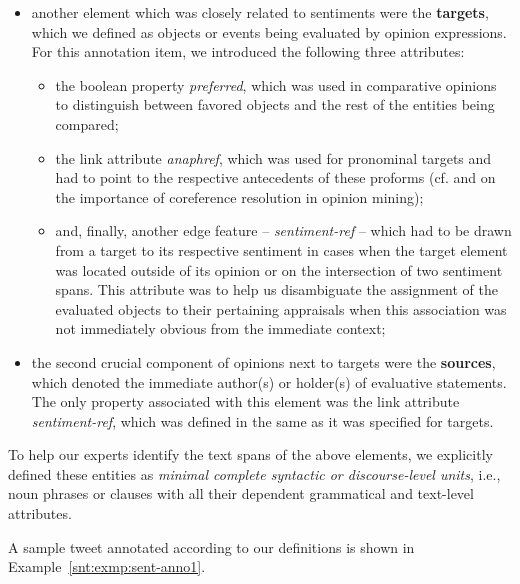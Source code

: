 \begin{itemize}
\item
  another element which was closely related to sentiments were the
  \textbf{targets}, which we defined as objects or events being
  evaluated by opinion expressions.  For this annotation item, we
  introduced the following three attributes:
  \begin{itemize}
    \item
      the boolean property \emph{preferred}, which was used in
      comparative opinions to distinguish between favored objects and
      the rest of the entities being compared;
    \item
      the link attribute \emph{anaphref}, which was used for
      pronominal targets and had to point to the respective
      antecedents of these proforms (cf. \citet{Stoyanov:06} and
      \citet{Ding:10} on the importance of coreference resolution in
      opinion mining);
    \item
      and, finally, another edge feature -- \emph{sentiment-ref} --
      which had to be drawn from a target to its respective sentiment
      in cases when the target element was located outside of its
      opinion or on the intersection of two sentiment spans.  This
      attribute was to help us disambiguate the assignment of the
      evaluated objects to their pertaining appraisals when this
      association was not immediately obvious from the immediate
      context;
  \end{itemize}

\item
  the second crucial component of opinions next to targets were the
  \textbf{sources}, which denoted the immediate author(s) or holder(s)
  of evaluative statements.  The only property associated with this
  element was the link attribute \emph{sentiment-ref}, which was
  defined in the same as it was specified for targets.
\end{itemize}

To help our experts identify the text spans of the above elements, we
explicitly defined these entities as \emph{minimal complete syntactic
  or discourse-level units}, i.e., noun phrases or clauses with all
their dependent grammatical and text-level attributes.

A sample tweet annotated according to our definitions is shown in
Example~\ref{snt:exmp:sent-anno1}.

\begin{example}\label{snt:exmp:sent-anno1}
  \upshape{}\\[0.8em]
  \noindent{}
\end{example}

